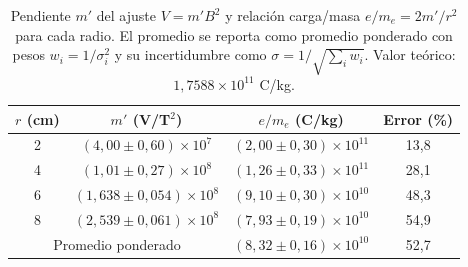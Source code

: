 \begin{table}[H]
\centering
\caption{Pendiente $m'$ del ajuste $V = m'B^2$ y relación carga/masa $e/m_e = 2m'/r^2$ para cada radio. El promedio se reporta como promedio ponderado con pesos $w_i = 1/\sigma_i^2$ y su incertidumbre como $\sigma = 1/\sqrt{\sum_i w_i}$. Valor teórico: $1,7588\times 10^{11}$ C/kg.}
\label{tab:resumen_em}
\begin{tabular}{cccc}
\toprule
$r$ (cm) & $m'$ (V/T$^2$) & $e/m_e$ (C/kg) & Error (\%) \\
\midrule
2 & $(4,00 \pm 0,60)\times 10^{7}$ & $(2,00 \pm 0,30)\times 10^{11}$ & 13,8 \\
4 & $(1,01 \pm 0,27)\times 10^{8}$ & $(1,26 \pm 0,33)\times 10^{11}$ & 28,1 \\
6 & $(1,638 \pm 0,054)\times 10^{8}$ & $(9,10 \pm 0,30)\times 10^{10}$ & 48,3 \\
8 & $(2,539 \pm 0,061)\times 10^{8}$ & $(7,93 \pm 0,19)\times 10^{10}$ & 54,9 \\
\midrule
\multicolumn{2}{c}{Promedio ponderado} & $(8,32 \pm 0,16)\times 10^{10}$ & 52,7 \\
\bottomrule
\end{tabular}
\end{table}
